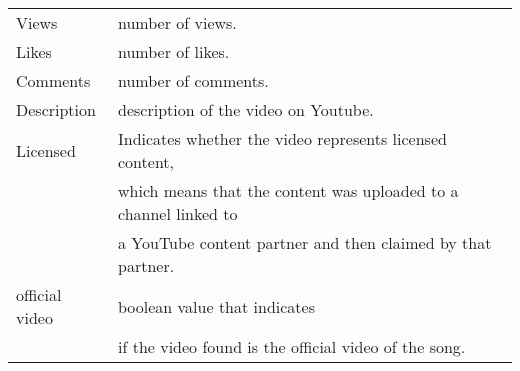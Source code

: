 \documentclass[12pt]{article}
\theoremstyle{remark}
\begin{document}
\begin{table}
\begin{tabular}{l|l}
Views & number of views.\\
Likes & number of likes.\\
Comments & number of comments.\\
Description & description of the video on Youtube.\\
Licensed & Indicates whether the video represents licensed content,\\
& which means that the content was uploaded to a channel linked to \\
& a YouTube content partner and then claimed by that partner.\\
official video & boolean value that indicates \\
& if the video found is the official video of the song.\\

	\hline
	\end{tabular}
\end{table}
\end{document}
